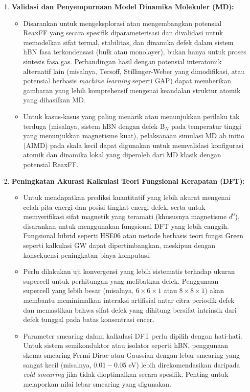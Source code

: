 \begin{enumerate}
    \item \textbf{Validasi dan Penyempurnaan Model Dinamika Molekuler (MD):}
    \begin{itemize}
        \item Disarankan untuk mengeksplorasi atau mengembangkan potensial ReaxFF yang secara spesifik diparameterisasi dan divalidasi untuk memodelkan sifat termal, stabilitas, dan dinamika defek dalam sistem hBN fasa terkondensasi (bulk atau monolayer), bukan hanya untuk proses sintesis fasa gas. Perbandingan hasil dengan potensial interatomik alternatif lain (misalnya, Tersoff, Stillinger-Weber yang dimodifikasi, atau potensial berbasis \textit{machine learning} seperti GAP) dapat memberikan gambaran yang lebih komprehensif mengenai keandalan struktur atomik yang dihasilkan MD.
        \item Untuk kasus-kasus yang paling menarik atau menunjukkan perilaku tak terduga (misalnya, sistem hBN dengan defek B$_N$ pada temperatur tinggi yang menunjukkan magnetisme kuat), pelaksanaan simulasi MD ab initio (AIMD) pada skala kecil dapat digunakan untuk memvalidasi konfigurasi atomik dan dinamika lokal yang diperoleh dari MD klasik dengan potensial ReaxFF.
    \end{itemize}

    \item \textbf{Peningkatan Akurasi Kalkulasi Teori Fungsional Kerapatan (DFT):}
    \begin{itemize}
        \item Untuk mendapatkan prediksi kuantitatif yang lebih akurat mengenai celah pita energi dan posisi tingkat energi defek, serta untuk memverifikasi sifat magnetik yang teramati (khususnya magnetisme $d^0$), disarankan untuk menggunakan fungsional DFT yang lebih canggih. Fungsional hibrid seperti HSE06 atau metode berbasis teori fungsi Green seperti kalkulasi GW dapat dipertimbangkan, meskipun dengan konsekuensi peningkatan biaya komputasi.
        \item Perlu dilakukan uji konvergensi yang lebih sistematis terhadap ukuran supercell untuk perhitungan yang melibatkan defek. Penggunaan supercell yang lebih besar (misalnya, $6 \times 6 \times 1$ atau $8 \times 8 \times 1$) akan membantu meminimalkan interaksi artifisial antar citra periodik defek dan memastikan bahwa sifat defek yang dihitung bersifat intrinsik dari defek tunggal pada batas konsentrasi encer.
        \item Parameter smearing dalam kalkulasi DFT perlu dipilih dengan hati-hati. Untuk sistem semikonduktor atau isolator seperti hBN, penggunaan skema smearing Fermi-Dirac atau Gaussian dengan lebar smearing yang sangat kecil (misalnya, $0.01-0.05$ eV) lebih direkomendasikan daripada \textit{cold smearing} jika tidak dioptimalkan secara spesifik. Penting untuk melaporkan nilai lebar smearing yang digunakan.
    \end{itemize}


\end{enumerate}

